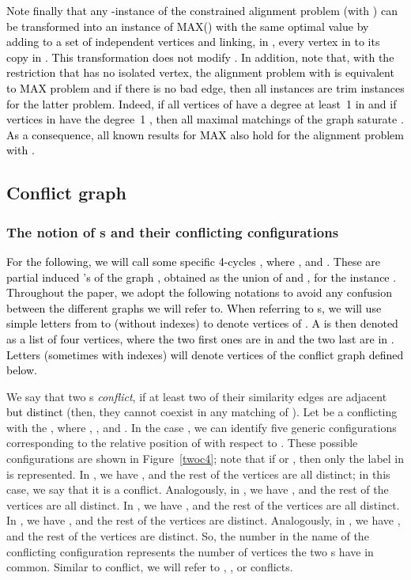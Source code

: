 \documentclass[final]{dmtcs-episciences}
\newcommand\mar[1]{\textcolor{black}{#1}}
\newcommand\ces[1]{\textcolor{black}{#1}}
\begin{document}
 \mar{Note finally that any -instance of the constrained alignment problem (with ) can be transformed into an  instance of MAX() with the same optimal value by adding to  a set  of  independent vertices and linking, in , every vertex in  to its copy in . This transformation does not modify . In addition, note that, with the restriction that  has no isolated vertex, the alignment problem with  is equivalent to {MAX} problem and if there is no bad edge, then all instances are trim instances for the latter problem. Indeed, if all vertices of   have a degree at least~1 in  and if vertices in  have the degree~1 , then all maximal matchings of the graph  saturate . As a consequence, all known results  for {MAX} also hold for the alignment problem with .} 


\subsection{Conflict graph}\label{subsec:conflict}
 
 \subsubsection{The notion of s and their conflicting configurations}
\ces{For the following,  we will call  some specific 4-cycles   , where 
,  and . These are partial induced 's of the graph , obtained as the union of  and , for the instance .} 
\mar{Throughout the paper, we adopt the following notations to avoid any confusion between the different graphs we will refer to. When referring to s, we will use simple letters from  to  (without indexes) to denote vertices of . A  is then denoted as a list of four vertices, where the two first ones are in  and the two last are in . Letters  (sometimes with indexes) will denote vertices of the conflict graph defined below.}

We say that
two s  \emph{ conflict}, if at least two of their similarity edges are adjacent \mar{but distinct} (then, they cannot coexist in any matching of ).
Let   be a  conflicting with the  , where , , and . 
In the case , we can identify five generic configurations corresponding to the relative position of  with respect to . These possible configurations are shown in Figure~\ref{twoc4}; note that if  or , then only the label in  is represented. In , we have , and the rest of the vertices are all distinct; in this case, we say that it is a  conflict. Analogously, in 
, we have , and the rest of the vertices are all distinct. In , we have
, and the rest of the vertices are all distinct. In , we have , and 
the rest of the vertices  are distinct. Analogously, in , we have , and the rest of the vertices 
 are distinct. So, the number in the name of the conflicting configuration represents the number of vertices the two s have in common. Similar to  conflict, we will refer to , ,  or  conflicts. 
\end{document}
